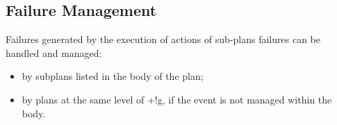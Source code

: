 %
%
%
%
%
%
%
%
% 
% 

 \subsection{Failure Management}

Failures generated by the execution of actions of sub-plans failures can be handled and managed:

\begin{itemize}
\item by subplans listed in the body of the plan;
\item by plans at the same level of +!g, if the event is not managed
  within the body.
\end{itemize}

